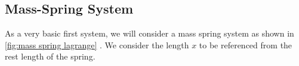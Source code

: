 \documentclass[10pt, openany, titlepage]{book}
\theoremstyle{definition}
\let\oldautoref\autoref
\renewcommand{\autoref}[1]{%
  \begingroup
  \hypersetup{linkcolor=black}%
  \oldautoref{#1}%
  \endgroup
}
\begin{document}
\subsection{Mass-Spring System}
As a very basic first system, we will consider a mass spring system as shown in \autoref{fig:mass spring lagrange}. We consider the length $x$ to be referenced from the rest length of the spring.
\begin{figure}[ht]

\centering


\begin{tikzpicture}[x=0.75pt,y=0.75pt,yscale=-1,xscale=1]


\end{tikzpicture}
\end{figure}
\end{document}
